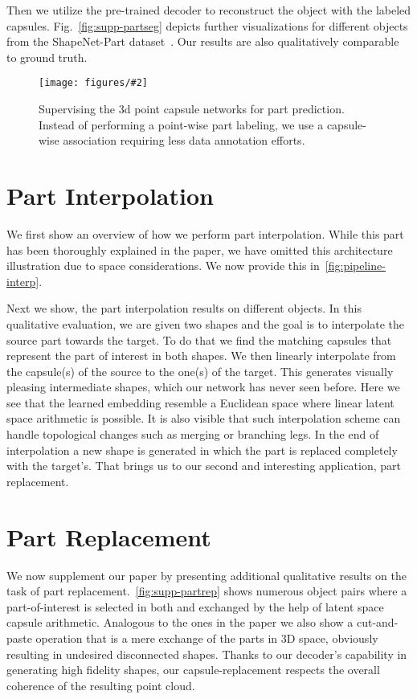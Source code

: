 \documentclass[10pt,twocolumn,letterpaper]{article}
\theoremstyle{break}
\newcommand{\insertimageC}[5]{ \begin{figure}[#5]
\centering
\texttt{[image: figures/\#2]}
\caption{#3}
\label{#4}
\end{figure}
}
\begin{document}
Then we utilize the pre-trained decoder to reconstruct the object with the labeled capsules. Fig.~\ref{fig:supp-partseg} depicts further visualizations for different objects from the ShapeNet-Part dataset~\cite{yi2016scalable}. Our results are also qualitatively comparable to ground truth.
\insertimageC{1}{Capsule-part-association2.pdf}{Supervising the 3d point capsule networks for part prediction. Instead of performing a point-wise part labeling, we use a capsule-wise association requiring less data annotation efforts.}{fig:supp-partseg-pipline}{hbtp}

\section{Part Interpolation}
We first show an overview of how we perform part interpolation. While this part has been thoroughly explained in the paper, we have omitted this architecture illustration due to space considerations. We now provide this in~\cref{fig:pipeline-interp}.

Next we show, the part interpolation results on different objects. In this qualitative evaluation, we are given two shapes and the goal is to interpolate the source part towards the target. To do that we find the matching capsules that represent the part of interest in both shapes. We then linearly interpolate from the capsule(s) of the source to the one(s) of the target. This generates visually pleasing intermediate shapes, which our network has never seen before. Here we see that the learned embedding resemble a Euclidean space where linear latent space arithmetic is possible. It is also visible that such interpolation scheme can handle topological changes such as merging or branching legs. In the end of interpolation a new shape is generated in which the part is replaced completely with the target's. That brings us to our second and interesting application, part replacement.

\section{Part Replacement}
We now supplement our paper by presenting additional qualitative results on the task of part replacement.~\cref{fig:supp-partrep} shows numerous object pairs where a part-of-interest is selected in both and exchanged by the help of latent space capsule arithmetic. Analogous to the ones in the paper we also show a cut-and-paste operation that is a mere exchange of the parts in 3D space, obviously resulting in undesired disconnected shapes. Thanks to our decoder's capability in generating high fidelity shapes, our capsule-replacement respects the overall coherence of the resulting point cloud.
\end{document}
